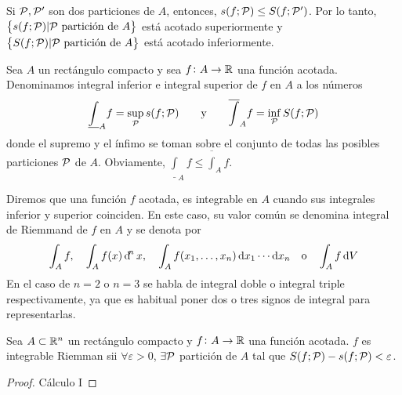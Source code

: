 \begin{col}
    Si $\mathcal{P}, \mathcal{P}^\prime$ son dos particiones de $A$, entonces,
    $s(f;\mathcal{P}) \leq S(f;\mathcal{P}^\prime)$. Por lo tanto,
    $\left\{s(f;\mathcal{P}) \vert \mathcal{P} \text{ partición de } A\right\}$ está acotado superiormente
    y $\left\{S(f;\mathcal{P}) \vert\mathcal{P}\text{ partición de } A\right\}$ está acotado inferiormente.
\end{col}

\begin{defi}
    Sea $A$ un rectángulo compacto y sea $f \colon A \to \mathbb{R}$ una función
    acotada. Denominamos integral inferior e integral superior de $f$ en $A$ a los
    números
    \[
        \underline{\int}_A f = \sup_{\mathcal{P}} s(f;\mathcal{P}) \qquad \text{y} \qquad
        \overline{\int}_A f = \inf_{\mathcal{P}} S(f;\mathcal{P})
    \]
    donde el supremo y el ínfimo se toman sobre el conjunto de todas las posibles
    particiones $\mathcal{P}$ de $A$. Obviamente, $\underline{\int}_A f \leq
    \overline{\int}_A f$.
\end{defi}

\begin{defi}
    Diremos que una función $f$ acotada, es integrable en $A$ cuando sus integrales
    inferior y superior coinciden. En este caso, su valor común se denomina
    integral de Riemmand de $f$ en $A$ y se denota por
    \[
        \int_A f, \quad \int_A f(x) \dif^nx, \quad \int_A f(x_1,\dots,x_n)
        \dif x_1 \cdots \dif x_n \quad \text{o} \quad \int_A f \dif V
    \]
    En el caso de $n=2$ o $n=3$ se habla de integral doble o integral triple
    respectivamente, ya que es habitual poner dos o tres signos de integral para
    representarlas.
\end{defi}

\begin{prop}
    Sea $A \subset \mathbb{R}^n$ un rectángulo compacto y $f \colon A \to \mathbb{R}$ una
    función acotada. $f$ es integrable Riemman sii $\forall \varepsilon > 0$,
    $\exists \mathcal{P}$ partición de $A$ tal que $S(f;\mathcal{P})-s(f;\mathcal{P}) < \varepsilon$.
\end{prop}
\begin{proof}
    Cálculo I
\end{proof}

